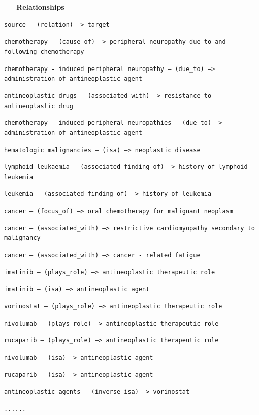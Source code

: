 \documentclass[10pt]{article}
\begin{document}
\begin{appendices}
\begin{tcolorbox}
\end{tcolorbox}


\begin{tcolorbox}[
    title=E4: GraphRAG Context Example,
    halign title=center,
  colback=white,        %
  colframe=blue,       %
  breakable,
  boxrule=0.8pt,        %
  arc=4mm,              %
  left=4pt,             %
  right=4pt,            %
  top=4pt,              %
  bottom=4pt,            %
  fontupper=\small
]
\label{prompt:GraphRAG-context}
\textbf{-----Relationships-----}

\texttt{source -- (relation) --> target}

\texttt{chemotherapy -- (cause\_of) --> peripheral neuropathy due to and following chemotherapy}

\texttt{chemotherapy - induced peripheral neuropathy -- (due\_to) --> administration of antineoplastic agent}

\texttt{antineoplastic drugs -- (associated\_with) --> resistance to antineoplastic drug}

\texttt{chemotherapy - induced peripheral neuropathies -- (due\_to) --> administration of antineoplastic agent}

\texttt{hematologic malignancies -- (isa) --> neoplastic disease}

\texttt{lymphoid leukaemia -- (associated\_finding\_of) --> history of lymphoid leukemia}

\texttt{leukemia -- (associated\_finding\_of) --> history of leukemia}

\texttt{cancer -- (focus\_of) --> oral chemotherapy for malignant neoplasm}

\texttt{cancer -- (associated\_with) --> restrictive cardiomyopathy secondary to malignancy}

\texttt{cancer -- (associated\_with) --> cancer - related fatigue}

\texttt{imatinib -- (plays\_role) --> antineoplastic therapeutic role}

\texttt{imatinib -- (isa) --> antineoplastic agent}

\texttt{vorinostat -- (plays\_role) --> antineoplastic therapeutic role}

\texttt{nivolumab -- (plays\_role) --> antineoplastic therapeutic role}

\texttt{rucaparib -- (plays\_role) --> antineoplastic therapeutic role}

\texttt{nivolumab -- (isa) --> antineoplastic agent}

\texttt{rucaparib -- (isa) --> antineoplastic agent}

\texttt{antineoplastic agents -- (inverse\_isa) --> vorinostat}

\texttt{......}
\end{tcolorbox}

\end{appendices}
\end{document}
